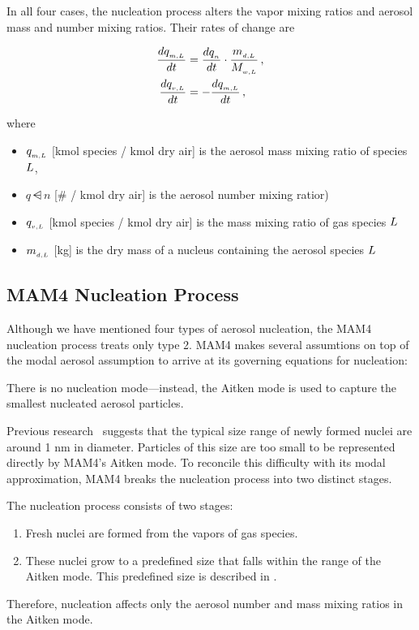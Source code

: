 In all four cases, the nucleation process alters the vapor mixing ratios and
aerosol mass and number mixing ratios. Their rates of change are

\begin{align}
\frac{d q\dsub{m,\specidx}}{dt} &= \frac{d q\dsub{n}}{dt} \cdot \frac{m\dsub{d,\specidx}}{\mw{\specidx}} \,, \labeleq{nuc:aer}\\
\frac{d\vmass{\specidx}}{dt} &= -\frac{d q\dsub{m,\specidx}}{dt} \,, \labeleq{nuc:gas}
\end{align}

where
\begin{itemize}
  \item $q_{_{m,L}}$ [kmol species / kmol dry air] is the aerosol mass
        mixing ratio of species $L$,
  \item $q\dsub{n}$ [# / kmol dry air] is the aerosol number mixing ratior)
  \item $q_{_{v,L}}$ [kmol species / kmol dry air] is the mass mixing
        ratio of gas species $L$
  \item $m_{_{d,L}}$ [kg] is the dry mass of a nucleus containing the
        aerosol species $L$
\end{itemize}

\subsection{MAM4 Nucleation Process}

Although we have mentioned four types of aerosol nucleation, the MAM4 nucleation
process treats only type 2. MAM4 makes several assumtions on top of the modal
aerosol assumption to arrive at its governing equations for nucleation:

\begin{assume}
  There is no nucleation mode---instead, the Aitken mode is used to capture the
  smallest nucleated aerosol particles.
\end{assume}

Previous research~\cite{kerminen-2002-jas} suggests that the typical size
range of newly formed nuclei are around 1 nm in diameter. Particles of this
size are too small to be represented directly by MAM4's Aitken mode. To
reconcile this difficulty with its modal approximation, MAM4 breaks the
nucleation process into two distinct stages.

\begin{assume}
  The nucleation process consists of two stages:
  \begin{enumerate}
    \item Fresh nuclei are formed from the vapors of gas species.
    \item These nuclei grow to a predefined size that falls within the range
      of the Aitken mode. This predefined size is described in
      .
  \end{enumerate}
  Therefore, nucleation affects only the aerosol number and mass mixing ratios
  in the Aitken mode.
\end{assume}

